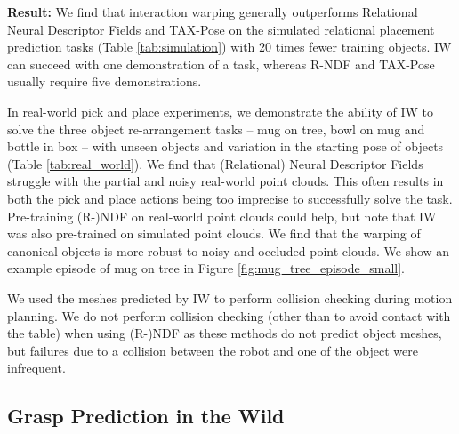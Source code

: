 \documentclass{article}
\newcommand{\ob}[1]{\textcolor{purple}{[\textbf{OB:} #1]}}
\begin{document}
\textbf{Result:} We find that interaction warping generally outperforms Relational Neural Descriptor Fields \cite{simeonov2022neural} and TAX-Pose \cite{pan22taxpose} on the simulated relational placement prediction tasks (Table \ref{tab:simulation}) with 20 times fewer training objects. IW can succeed with one demonstration of a task, whereas R-NDF and TAX-Pose usually require five demonstrations. 

In real-world pick and place experiments, we demonstrate the ability of IW to solve the three object re-arrangement tasks -- mug on tree, bowl on mug and bottle in box -- with unseen objects and variation in the starting pose of objects (Table \ref{tab:real_world}). We find that (Relational) Neural Descriptor Fields \cite{simeonov22neural,simeonov22se} struggle with the partial and noisy real-world point clouds. This often results in both the pick and place actions being too imprecise to successfully solve the task. Pre-training (R-)NDF on real-world point clouds could help, but note that IW was also pre-trained on simulated point clouds. We find that the warping of canonical objects is more robust to noisy and occluded point clouds. We show an example episode of mug on tree in Figure \ref{fig:mug_tree_episode_small}.

We used the meshes predicted by IW to perform collision checking during motion planning. We do not perform collision checking (other than to avoid contact with the table) when using (R-)NDF as these methods do not predict object meshes, but failures due to a collision between the robot and one of the object were infrequent.


\subsection{Grasp Prediction in the Wild}
\label{sec:exp:wild}
\end{document}
